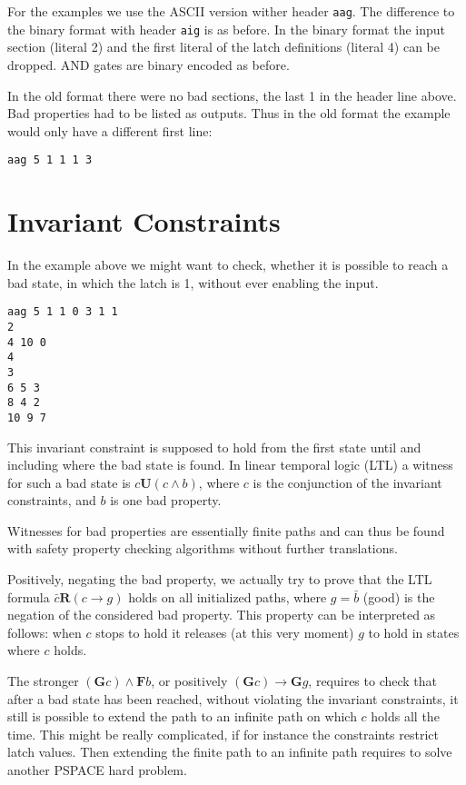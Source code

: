 \documentclass{llncs}
\begin{document}
For the examples we use the ASCII
version wither header \texttt{aag}.  The difference to the binary format
with header \texttt{aig} is as before.  In the binary format
the input section (literal 2) and the first literal of the latch definitions
(literal 4) can be dropped.  AND gates are binary encoded as before.

In the old format there were no bad sections, the last 1 in the header line
above.  Bad properties had to be listed as outputs.  Thus in the old format
the example would only have a different first line:
{\small
\begin{verbatim}
aag 5 1 1 1 3
\end{verbatim}}

\section{Invariant Constraints}

In the example above we might want to check, whether it is possible to reach
a bad state, in which the latch is 1, without ever enabling the input.
{\small
\begin{verbatim}
aag 5 1 1 0 3 1 1
2
4 10 0
4
3
6 5 3
8 4 2
10 9 7
\end{verbatim}}
This invariant constraint is supposed to hold from the first state
until and including where the bad state is found.  In linear temporal logic
(LTL) a witness for such a bad state is 
$ \mathit{c} \mathrel{\mathbf{U}} (c \wedge b) $,
where $c$ is the conjunction of the invariant constraints, and $b$ is
one bad property.  

Witnesses for bad properties are essentially finite paths
and can thus be found with safety property checking algorithms without
further translations.

Positively, negating the bad property, we actually try to prove that the LTL
formula $ \mathit{\bar c} \mathrel{\mathbf{R}} (c \to g) $ holds on
all initialized paths, where $g = \bar b$ (good) is the negation of the
considered bad property.  This property can be interpreted as follows: when $c$
stops to hold it releases (at this very moment) $g$ to hold in states where
$c$ holds.

The stronger ${(\mathrel{\mathbf{G}} c)} \wedge {\mathrel{\mathbf{F}}b}$,
or positively ${(\mathrel{\mathbf{G}} c)} \to {\mathrel{\mathbf{G}}g}$,
requires to check that after a bad state has been
reached, without violating the invariant constraints, it still is possible
to extend the path to an infinite path on which $c$ holds all the time.
This might be really complicated, if for instance the constraints restrict
latch values.  Then extending the finite path to an infinite path requires
to solve another PSPACE hard problem.
\end{document}
